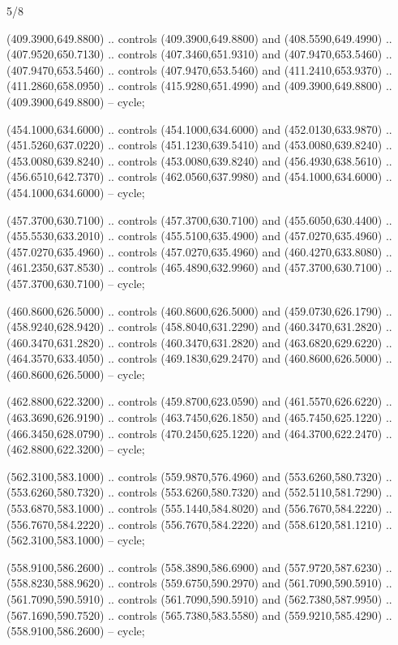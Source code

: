 \begin{flagdescription}{5/8}
\begin{scope}[shift={(m)}]
\begin{scope}[scale=\flagwidth/220,y=0.1mm, x=0.1mm, yscale=-1,shift={(-596,-360)}]
\begin{scope}[cm={{-1.0,0.0,0.0,1.0,(1193.9797,0.0)}}]
\begin{scope}[draw=black,line join=round,line cap=round,line width=0.381\lw]
\begin{scope}[fill=gold]
 (409.3900,649.8800) .. controls (409.3900,649.8800) and
  (408.5590,649.4990) .. (407.9520,650.7130) .. controls (407.3460,651.9310) and
  (407.9470,653.5460) .. (407.9470,653.5460) .. controls (407.9470,653.5460) and
  (411.2410,653.9370) .. (411.2860,658.0950) .. controls (415.9280,651.4990) and
  (409.3900,649.8800) .. (409.3900,649.8800) -- cycle;

 (454.1000,634.6000) .. controls (454.1000,634.6000) and
  (452.0130,633.9870) .. (451.5260,637.0220) .. controls (451.1230,639.5410) and
  (453.0080,639.8240) .. (453.0080,639.8240) .. controls (453.0080,639.8240) and
  (456.4930,638.5610) .. (456.6510,642.7370) .. controls (462.0560,637.9980) and
  (454.1000,634.6000) .. (454.1000,634.6000) -- cycle;

 (457.3700,630.7100) .. controls (457.3700,630.7100) and
  (455.6050,630.4400) .. (455.5530,633.2010) .. controls (455.5100,635.4900) and
  (457.0270,635.4960) .. (457.0270,635.4960) .. controls (457.0270,635.4960) and
  (460.4270,633.8080) .. (461.2350,637.8530) .. controls (465.4890,632.9960) and
  (457.3700,630.7100) .. (457.3700,630.7100) -- cycle;

 (460.8600,626.5000) .. controls (460.8600,626.5000) and
  (459.0730,626.1790) .. (458.9240,628.9420) .. controls (458.8040,631.2290) and
  (460.3470,631.2820) .. (460.3470,631.2820) .. controls (460.3470,631.2820) and
  (463.6820,629.6220) .. (464.3570,633.4050) .. controls (469.1830,629.2470) and
  (460.8600,626.5000) .. (460.8600,626.5000) -- cycle;

 (462.8800,622.3200) .. controls (459.8700,623.0590) and
  (461.5570,626.6220) .. (463.3690,626.9190) .. controls (463.7450,626.1850) and
  (465.7450,625.1220) .. (466.3450,628.0790) .. controls (470.2450,625.1220) and
  (464.3700,622.2470) .. (462.8800,622.3200) -- cycle;

 (562.3100,583.1000) .. controls (559.9870,576.4960) and
  (553.6260,580.7320) .. (553.6260,580.7320) .. controls (553.6260,580.7320) and
  (552.5110,581.7290) .. (553.6870,583.1000) .. controls (555.1440,584.8020) and
  (556.7670,584.2220) .. (556.7670,584.2220) .. controls (556.7670,584.2220) and
  (558.6120,581.1210) .. (562.3100,583.1000) -- cycle;

 (558.9100,586.2600) .. controls (558.3890,586.6900) and
  (557.9720,587.6230) .. (558.8230,588.9620) .. controls (559.6750,590.2970) and
  (561.7090,590.5910) .. (561.7090,590.5910) .. controls (561.7090,590.5910) and
  (562.7380,587.9950) .. (567.1690,590.7520) .. controls (565.7380,583.5580) and
  (559.9210,585.4290) .. (558.9100,586.2600) -- cycle;


\end{scope}
\end{scope}
\end{scope}
\end{scope}
\end{scope}
\end{flagdescription}

